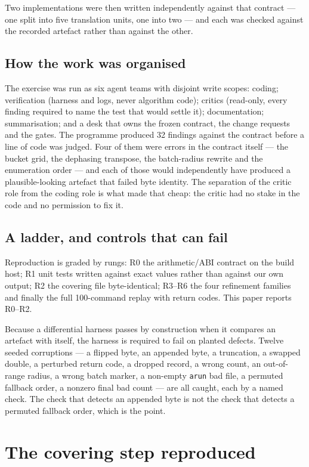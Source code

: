 \documentclass[11pt,a4paper]{article}
\newcommand{\code}[1]{\texttt{\small #1}}
\begin{document}
Two implementations were then written independently against that contract --- one split into five
translation units, one into two --- and each was checked against the recorded artefact rather than
against the other.

\subsection{How the work was organised}
The exercise was run as six agent teams with disjoint write scopes: coding; verification (harness and
logs, never algorithm code); critics (read-only, every finding required to name the test that would
settle it); documentation; summarisation; and a desk that owns the frozen contract, the change
requests and the gates. The programme produced 32 findings against the contract before a line of code
was judged. Four of them were errors in the contract
itself --- the bucket grid, the dephasing transpose, the batch-radius rewrite and the enumeration
order --- and each of those would independently have produced a plausible-looking artefact that
failed byte identity. The separation of the critic role from the coding role is what made that cheap:
the critic had no stake in the code and no permission to fix it.

\subsection{A ladder, and controls that can fail}
Reproduction is graded by rungs: R0 the arithmetic/ABI contract on the build host; R1 unit tests
written against exact values rather than against our own output; R2 the covering file byte-identical;
R3--R6 the four refinement families and finally the full 100-command replay with return codes. This
paper reports R0--R2.

Because a differential harness passes by construction when it compares an artefact with itself, the
harness is required to fail on planted defects. Twelve seeded corruptions --- a flipped byte, an
appended byte, a truncation, a swapped double, a perturbed return code, a dropped record, a wrong
count, an out-of-range radius, a wrong batch marker, a non-empty \code{arun} bad file, a permuted
fallback order, a nonzero final bad count --- are all caught, each by a named check. The check that
detects an appended byte is not the check that detects a permuted fallback order, which is the point.

\section{The covering step reproduced}\label{sec:results}
\end{document}

